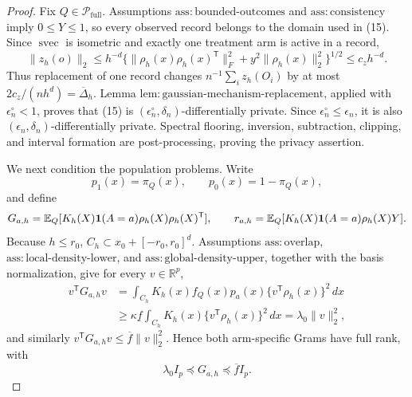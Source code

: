 \documentclass{article}
\begin{document}
\begin{proof}
Fix \(Q\in\mathcal P_{\mathrm{full}}\).  Assumptions \(\mathrm{ass{:}bounded\text{-}outcomes}\) and \(\mathrm{ass{:}consistency}\) imply \(0\le Y\le1\), so every observed record belongs to the domain used in (15).  Since \(\operatorname{svec}\) is isometric and exactly one treatment arm is active in a record,
\[
 \|z_h(o)\|_2
 \le h^{-d}\{\|\rho_h(x)\rho_h(x)^{\mathsf T}\|_F^2
                  +y^2\|\rho_h(x)\|_2^2\}^{1/2}
 \le c_zh^{-d}.
\tag{20}
\]
Thus replacement of one record changes \(n^{-1}\sum_i z_h(O_i)\) by at most \(2c_z/(nh^d)=\overline\Delta_h\).  Lemma \(\mathrm{lem{:}gaussian\text{-}mechanism\text{-}replacement}\), applied with \(\epsilon_n^\circ<1\), proves that (15) is \((\epsilon_n^\circ,\delta_n)\)-differentially private.  Since \(\epsilon_n^\circ\le\epsilon_n\), it is also \((\epsilon_n,\delta_n)\)-differentially private.  Spectral flooring, inversion, subtraction, clipping, and interval formation are post-processing, proving the privacy assertion.

We next condition the population problems.  Write
\[
 p_1(x)=\pi_Q(x),\qquad p_0(x)=1-\pi_Q(x),
\]
and define
\[
 G_{a,h}=\mathbb E_Q[K_h(X){\bf1}(A=a)\rho_h(X)\rho_h(X)^{\mathsf T}],
 \qquad
 r_{a,h}=\mathbb E_Q[K_h(X){\bf1}(A=a)\rho_h(X)Y].
\]
Because \(h\le r_0\), \(C_h\subset x_0+[-r_0,r_0]^d\).  Assumptions \(\mathrm{ass{:}overlap}\), \(\mathrm{ass{:}local\text{-}density\text{-}lower}\), and \(\mathrm{ass{:}global\text{-}density\text{-}upper}\), together with the basis normalization, give for every \(v\in\mathbb R^p\),
\[
 \begin{aligned}
 v^{\mathsf T}G_{a,h}v
 &=\int_{C_h}K_h(x)f_Q(x)p_a(x)
       \{v^{\mathsf T}\rho_h(x)\}^2\,dx\\
 &\ge\kappa\underline f\int_{C_h}K_h(x)
       \{v^{\mathsf T}\rho_h(x)\}^2\,dx
 =\lambda_0\|v\|_2^2,
 \end{aligned}
\tag{21}
\]
and similarly \(v^{\mathsf T}G_{a,h}v\le\overline f\|v\|_2^2\).  Hence both arm-specific Grams have full rank, with
\[
 \lambda_0I_p\preceq G_{a,h}\preceq\overline f I_p.
\tag{22}
\]


\end{proof}
\end{document}
